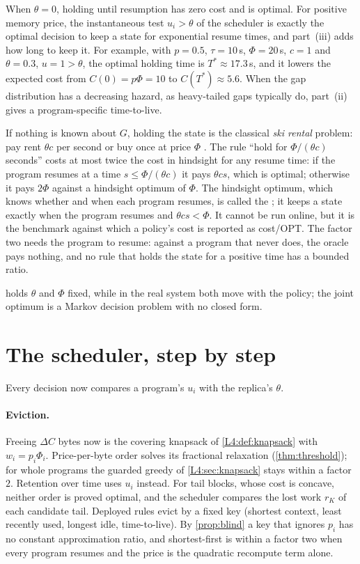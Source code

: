 When $\theta=0$, holding until resumption has zero cost and is optimal.
For positive memory price, the instantaneous test $u_i>\theta$ of the scheduler is exactly the optimal decision
to keep a state for exponential resume times, and part~(iii) adds how long to keep it.
For example, with $p=0.5$, $\tau=10$\,s, $\Phi=20$\,s, $c=1$ and $\theta=0.3$, $u=1>\theta$,
the optimal holding time is $T^*\approx17.3$\,s, and it lowers the expected cost from
$C(0)=p\Phi=10$ to $C(T^*)\approx5.6$. When the gap distribution has a decreasing hazard, as
heavy-tailed gaps typically do, part~(ii) gives a program-specific time-to-live.

\begin{remark}\label{L5:rem:ski}
If nothing is known about $G$, holding the state is the classical \emph{ski rental}
problem: pay rent $\theta c$ per second or buy once at price $\Phi$
\cite{karlin1988}. The rule ``hold for $\Phi/(\theta c)$ seconds'' costs at most twice
the cost in hindsight for any resume time: if the program resumes at a time
$s\le\Phi/(\theta c)$ it pays $\theta c s$, which is optimal; otherwise it pays
$2\Phi$ against a hindsight optimum of $\Phi$. The hindsight optimum, which knows
whether and when each program resumes, is called the ; it keeps a state
exactly when the program resumes and $\theta c s<\Phi$. It cannot be run online, but
it is the benchmark against which a policy's cost is reported as cost/OPT. The factor
two needs the program to resume: against a program that never does, the oracle pays
nothing, and no rule that holds the state for a positive time has a bounded ratio.
\end{remark}

 holds $\theta$ and $\Phi$ fixed, while in the real system both move
with the policy; the joint optimum is a Markov decision problem with no closed form.

\section{The scheduler, step by step}\label{L5:sec:scheduler}

Every decision now compares a program's $u_i$ with the replica's $\theta$.

\paragraph{Eviction.} Freeing $\Delta C$ bytes now is the covering knapsack of
\cref{L4:def:knapsack} with $w_i=p_i\Phi_i$. Price-per-byte order solves its fractional
relaxation (\cref{thm:threshold}); for whole programs the guarded greedy of
\cref{L4:sec:knapsack} stays within a factor $2$. Retention over time uses $u_i$
instead. For tail blocks, whose cost is concave, neither order is proved optimal, and
the scheduler compares the lost work $r_K$ of each candidate tail. Deployed rules evict
by a fixed key (shortest context, least recently used, longest idle, time-to-live).
By \cref{prop:blind} a key that ignores $p_i$ has no constant approximation ratio, and
shortest-first is within a factor two when every program resumes and the price is the
quadratic recompute term alone.

